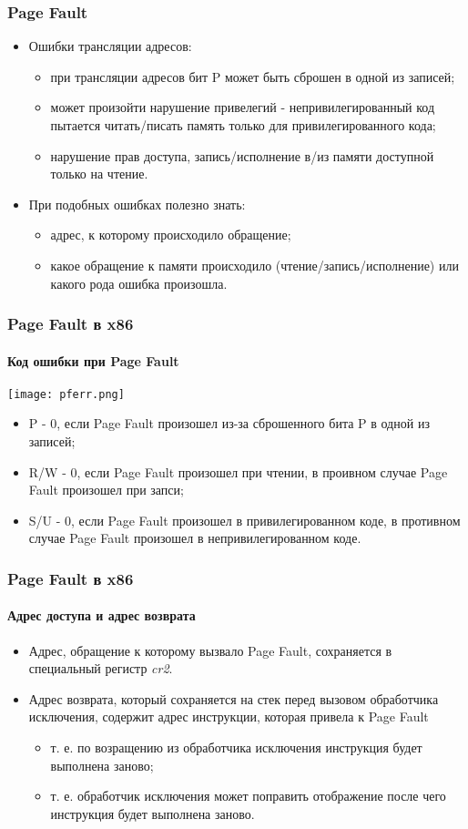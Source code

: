 \begin{frame}
\frametitle{Page Fault}
\begin{itemize}
  \item Ошибки трансляции адресов:
  \begin{itemize}
    \item при трансляции адресов бит P может быть сброшен в одной из записей;
    \item может произойти нарушение привелегий - непривилегированный код
    пытается читать/писать память только для привилегированного кода;
    \item нарушение прав доступа, запись/исполнение в/из памяти доступной только
    на чтение.
  \end{itemize}
  \item При подобных ошибках полезно знать:
  \begin{itemize}
    \item адрес, к которому происходило обращение;
    \item какое обращение к памяти происходило (чтение/запись/исполнение) или
    какого рода ошибка произошла.
  \end{itemize}
\end{itemize}
\end{frame}

\begin{frame}
\frametitle{Page Fault в x86}
\framesubtitle{Код ошибки при Page Fault}
\begin{center}
  \texttt{[image: pferr.png]}
\end{center}
\begin{itemize}
  \item P - 0, если Page Fault произошел из-за сброшенного бита P в одной из
  записей;
  \item R/W - 0, если Page Fault произошел при чтении, в проивном случае Page
  Fault произошел при запси;
  \item S/U - 0, если Page Fault произошел в привилегированном коде, в противном
  случае Page Fault произошел в непривилегированном коде.
\end{itemize}
\end{frame}

\begin{frame}
\frametitle{Page Fault в x86}
\framesubtitle{Адрес доступа и адрес возврата}
\begin{itemize}
  \item Адрес, обращение к которому вызвало Page Fault, сохраняется в
  специальный регистр \emph{cr2}.
  \item Адрес возврата, который сохраняется на стек перед вызовом обработчика
  исключения, содержит адрес инструкции, которая привела к Page Fault
  \begin{itemize}
    \item т. е. по возращению из обработчика исключения инструкция будет
    выполнена заново;
    \item т. е. обработчик исключения может поправить отображение после чего
    инструкция будет выполнена заново.
  \end{itemize}
\end{itemize}
\end{frame}

